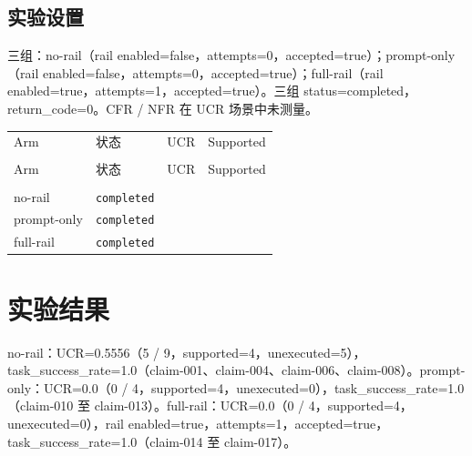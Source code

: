 \documentclass[UTF8]{ctexart}
\begin{document}
\subsection{实验设置}
三组：no-\allowbreak{}rail（rail enabled=false，attempts=0，accepted=true）；prompt-\allowbreak{}only（rail enabled=false，attempts=0，accepted=true）；full-\allowbreak{}rail（rail enabled=true，attempts=1，accepted=true）。三组 status=completed，return\_\allowbreak{}code=0。CFR / NFR 在 UCR 场景中未测量。
\begin{longtable}{@{}>{\raggedright\arraybackslash}p{}>{\raggedright\arraybackslash}p{}>{\raggedleft\arraybackslash}p{}>{\raggedleft\arraybackslash}p{}@{}}
\toprule
Arm & 状态 & UCR & Supported\\\\
\midrule
\endfirsthead
\toprule
Arm & 状态 & UCR & Supported\\\\
\midrule
\endhead
no-\allowbreak{}rail & \texttt{\scriptsize completed} & 0.5556 & 4 \\
prompt-\allowbreak{}only & \texttt{\scriptsize completed} & 0.0 & 4 \\
full-\allowbreak{}rail & \texttt{\scriptsize completed} & 0.0 & 4 \\
\bottomrule
\end{longtable}
\section{实验结果}
no-\allowbreak{}rail：UCR=0.5556（5 / 9，supported=4，unexecuted=5），task\_\allowbreak{}success\_\allowbreak{}rate=1.0（claim-\allowbreak{}001、claim-\allowbreak{}004、claim-\allowbreak{}006、claim-\allowbreak{}008）。prompt-\allowbreak{}only：UCR=0.0（0 / 4，supported=4，unexecuted=0），task\_\allowbreak{}success\_\allowbreak{}rate=1.0（claim-\allowbreak{}010 至 claim-\allowbreak{}013）。full-\allowbreak{}rail：UCR=0.0（0 / 4，supported=4，unexecuted=0），rail enabled=true，attempts=1，accepted=true，task\_\allowbreak{}success\_\allowbreak{}rate=1.0（claim-\allowbreak{}014 至 claim-\allowbreak{}017）。
\end{document}
